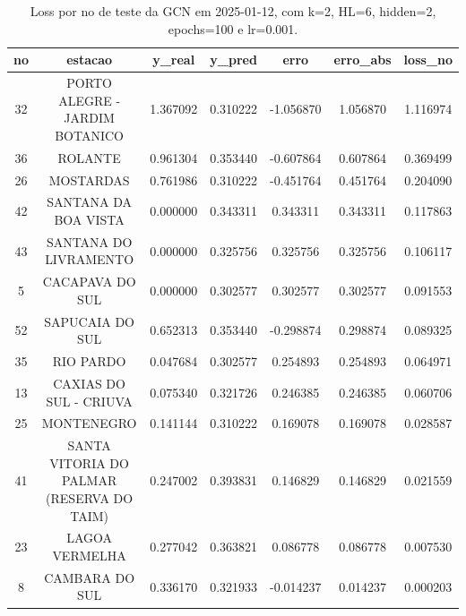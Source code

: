 \begin{table}[h]
\centering
\caption{Loss por no de teste da GCN em 2025-01-12, com k=2, HL=6, hidden=2, epochs=100 e lr=0.001.}
\label{tab:gcn_loss_k2_hl6_h2_e100_d20250112}
\begin{tabular}{ccccccc}
\toprule
no & estacao & y\_real & y\_pred & erro & erro\_abs & loss\_no \\
\midrule
32 & PORTO ALEGRE - JARDIM BOTANICO & 1.367092 & 0.310222 & -1.056870 & 1.056870 & 1.116974 \\
36 & ROLANTE & 0.961304 & 0.353440 & -0.607864 & 0.607864 & 0.369499 \\
26 & MOSTARDAS & 0.761986 & 0.310222 & -0.451764 & 0.451764 & 0.204090 \\
42 & SANTANA DA BOA VISTA & 0.000000 & 0.343311 & 0.343311 & 0.343311 & 0.117863 \\
43 & SANTANA DO LIVRAMENTO & 0.000000 & 0.325756 & 0.325756 & 0.325756 & 0.106117 \\
5 & CACAPAVA DO SUL & 0.000000 & 0.302577 & 0.302577 & 0.302577 & 0.091553 \\
52 & SAPUCAIA DO SUL & 0.652313 & 0.353440 & -0.298874 & 0.298874 & 0.089325 \\
35 & RIO PARDO & 0.047684 & 0.302577 & 0.254893 & 0.254893 & 0.064971 \\
13 & CAXIAS DO SUL - CRIUVA & 0.075340 & 0.321726 & 0.246385 & 0.246385 & 0.060706 \\
25 & MONTENEGRO & 0.141144 & 0.310222 & 0.169078 & 0.169078 & 0.028587 \\
41 & SANTA VITORIA DO PALMAR (RESERVA DO TAIM) & 0.247002 & 0.393831 & 0.146829 & 0.146829 & 0.021559 \\
23 & LAGOA VERMELHA & 0.277042 & 0.363821 & 0.086778 & 0.086778 & 0.007530 \\
8 & CAMBARA DO SUL & 0.336170 & 0.321933 & -0.014237 & 0.014237 & 0.000203 \\
\bottomrule
\end{tabular}
\end{table}
